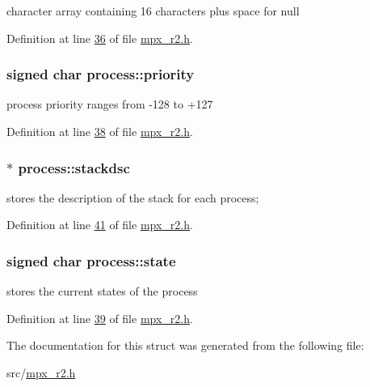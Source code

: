 character array containing 16 characters plus space for null 



Definition at line \hyperlink{mpx__r2_8h_source_l00036}{36} of file \hyperlink{mpx__r2_8h_source}{mpx\_\-r2.h}.

\hypertarget{structprocess_a788405fd9aeccd863516f34d3ce1c41e}{
\subsubsection[{priority}]{\setlength{\rightskip}{0pt plus 5cm}signed char {\bf process::priority}}}
\label{structprocess_a788405fd9aeccd863516f34d3ce1c41e}


process priority ranges from -\/128 to +127 



Definition at line \hyperlink{mpx__r2_8h_source_l00038}{38} of file \hyperlink{mpx__r2_8h_source}{mpx\_\-r2.h}.

\hypertarget{structprocess_a7e0fb37fbb9c155b18f75a94a8fc202b}{
\subsubsection[{stackdsc}]{$\ast$ {\bf process::stackdsc}}}
\label{structprocess_a7e0fb37fbb9c155b18f75a94a8fc202b}


stores the description of the stack for each process; 



Definition at line \hyperlink{mpx__r2_8h_source_l00041}{41} of file \hyperlink{mpx__r2_8h_source}{mpx\_\-r2.h}.

\hypertarget{structprocess_af8bb04355feac474fa959e3db52618c9}{
\subsubsection[{state}]{\setlength{\rightskip}{0pt plus 5cm}signed char {\bf process::state}}}
\label{structprocess_af8bb04355feac474fa959e3db52618c9}


stores the current states of the process 



Definition at line \hyperlink{mpx__r2_8h_source_l00039}{39} of file \hyperlink{mpx__r2_8h_source}{mpx\_\-r2.h}.



The documentation for this struct was generated from the following file:\begin{DoxyCompactItemize}
\item 
src/\hyperlink{mpx__r2_8h}{mpx\_\-r2.h}\end{DoxyCompactItemize}
